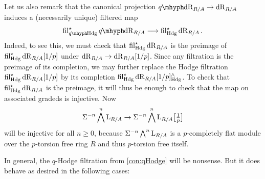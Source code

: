 \documentclass[DIV=12,numbers=enddot,leqno,bibliography=totoc]{scrartcl}
\begin{document}
\begin{con}
		Let us also remark that the canonical projection $\qdeRham_{R/A}\rightarrow \deRham_{R/A}$ induces a (necessarily unique) filtered map
		\begin{equation*}
			\fil_{\qHodge}^\star \qdeRham_{R/A}\longrightarrow \fil_{\Hodge}^\star \deRham_{R/A}\,.
		\end{equation*}
		Indeed, to see this, we must check that $\operatorname{fil}_{\mathrm{Hdg}}^\star \mathrm{dR}_{R/A}$ is the preimage of $\operatorname{fil}_{\mathrm{Hdg}}^\star\mathrm{dR}_{R/A}[1/p]$ under $\mathrm{dR}_{R/A}\rightarrow \mathrm{dR}_{R/A}[1/p]$. Since any filtration is the preimage of its completion, we may further replace the Hodge filtration $\operatorname{fil}_{\mathrm{Hdg}}^\star\mathrm{dR}_{R/A}[1/p]$ by its completion $\operatorname{fil}_{\mathrm{Hdg}}^\star\mathrm{dR}_{R/A}[1/p]_{\mathrm{Hdg}}^\wedge$. To check that $\operatorname{fil}_{\mathrm{Hdg}}^\star\mathrm{dR}_{R/A}$ is the preimage, it will thus be enough to check that the map on associated gradeds is injective. Now
		\begin{equation*}
			\Sigma^{-n}\bigwedge^n\mathrm{L}_{R/A}\rightarrow \Sigma^{-n}\bigwedge^n \mathrm{L}_{R/A}\bigl[{\textstyle\frac{1}{p}}\bigr]
		\end{equation*}
		will be injective for all $n\geqslant 0$, because $\Sigma^{-n}\bigwedge^n\mathrm{L}_{R/A}$ is a $p$-completely flat module over the $p$-torsion free ring $R$ and thus $p$-torsion free itself.
	\end{con}
	In general, the $q$-Hodge filtration from \cref{con:qHodge} will be nonsense. But it does behave as desired in the following cases:
	
\end{document}
